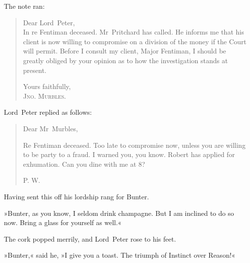 The note ran:

\begin{samepage}
\begin{quotation}
\noindent Dear Lord~Peter,\\
\nopagebreak[4]
\indent In re Fentiman deceased. Mr~Pritchard has called. He informs me that his client is now willing to compromise on a division of the money if the Court will permit. Before I consult my client, Major Fentiman, I should be greatly obliged by your opinion as to how the investigation stands at present.
\begin{flushright}
Yours faithfully,\\
\nopagebreak[4]
\textsc{Jno. Murbles.}
\end{flushright}
\end{quotation}
\end{samepage}

Lord~Peter replied as follows:
\begin{samepage}
\begin{quotation}
\noindent Dear Mr~Murbles,

\indent Re Fentiman deceased. Too late to compromise now, unless you are willing to be party to a fraud. I warned you, you know. Robert has applied for exhumation. Can you dine with me at 8?
\begin{flushright}
\textsc{P. W.}
\end{flushright}
\end{quotation}
\end{samepage}

Having sent this off his lordship rang for Bunter.

»Bunter, as you know, I seldom drink champagne. But I am inclined to do so now. Bring a glass for yourself as well.«

The cork popped merrily, and Lord~Peter rose to his feet.

»Bunter,« said he, »I give you a toast. The triumph of Instinct over Reason!«